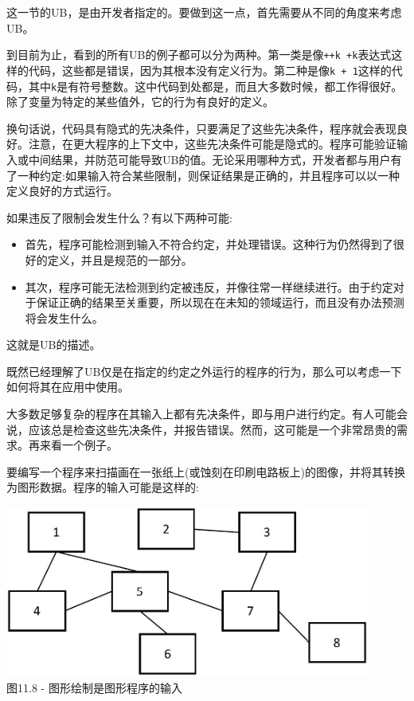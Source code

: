 这一节的UB，是由开发者指定的。要做到这一点，首先需要从不同的角度来考虑UB。 

到目前为止，看到的所有UB的例子都可以分为两种。第一类是像\texttt{++k +k}表达式这样的代码，这些都是错误，因为其根本没有定义行为。第二种是像\texttt{k + 1}这样的代码，其中\texttt{k}是有符号整数。这中代码到处都是，而且大多数时候，都工作得很好。除了变量为特定的某些值外，它的行为有良好的定义。

换句话说，代码具有隐式的先决条件，只要满足了这些先决条件，程序就会表现良好。注意，在更大程序的上下文中，这些先决条件可能是隐式的。程序可能验证输入或中间结果，并防范可能导致UB的值。无论采用哪种方式，开发者都与用户有了一种约定:如果输入符合某些限制，则保证结果是正确的，并且程序可以以一种定义良好的方式运行。

如果违反了限制会发生什么？有以下两种可能:

\begin{itemize}
\item 
首先，程序可能检测到输入不符合约定，并处理错误。这种行为仍然得到了很好的定义，并且是规范的一部分。

\item 
其次，程序可能无法检测到约定被违反，并像往常一样继续进行。由于约定对于保证正确的结果至关重要，所以现在在未知的领域运行，而且没有办法预测将会发生什么。
\end{itemize}

这就是UB的描述。

既然已经理解了UB仅是在指定的约定之外运行的程序的行为，那么可以考虑一下如何将其在应用中使用。

大多数足够复杂的程序在其输入上都有先决条件，即与用户进行约定。有人可能会说，应该总是检查这些先决条件，并报告错误。然而，这可能是一个非常昂贵的需求。再来看一个例子。

要编写一个程序来扫描画在一张纸上(或蚀刻在印刷电路板上)的图像，并将其转换为图形数据。程序的输入可能是这样的:

\begin{center}
\includegraphics[width=0.9\textwidth]{content/3/chapter11/images/8.jpg}\\
图11.8 - 图形绘制是图形程序的输入
\end{center}

